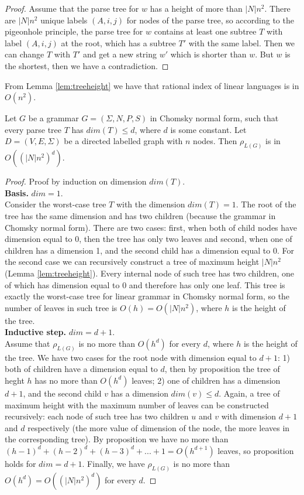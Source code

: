 \begin{proof}
 Assume that the parse tree for $w$ has a height of more than $|N|n^2$. There are $|N|n^2$ unique labels $(A, i, j)$ for nodes of the parse tree, so according to the pigeonhole principle, the parse tree for $w$ contains at least one subtree $T$ with label $(A, i, j)$ at the root, which has a subtree $T'$ with the same label. Then we can change $T$ with $T'$ and get a new string $w'$ which is shorter than $w$. But $w$ is the shortest, then we have a contradiction.

\end{proof}
From Lemma \ref{lem:treeheight} we have that rational index of linear languages is in $O(n^2)$. 
\begin{lemma}
\label{oscbnddim}
Let $G$ be a grammar $G = (\Sigma, N, P, S)$ in Chomsky normal form, such that every parse tree $T$ has $dim(T) \le d$, where $d$ is some constant. Let $D=(V, E, \Sigma)$ be a directed labelled graph with $n$ nodes. Then $\rho_{L(G)}$ is in $O({(|N|n^2)}^d)$.
\end{lemma}
\begin{proof}
Proof by induction on dimension $dim(T)$.
\\
\textbf{Basis.} $dim = 1$.
\\
Consider the worst-case tree $T$ with the dimension $dim(T) = 1$. The root of the tree has the same dimension and has two children (because the grammar in Chomsky normal form). There are two cases:  first, when both of child nodes have dimension equal to 0, then the tree has only two leaves and second, when one of children has a dimension 1, and the second child has a dimension equal to 0. For the second case we can recursively construct a tree of maximum height $|N|n^2$ (Lemma \ref{lem:treeheight}). Every internal node of such tree has two children, one of which has dimension equal to 0 and therefore has only one leaf. This tree is exactly the worst-case tree for linear grammar in Chomsky normal form, so the number of leaves in such tree is $O(h) = O(|N|n^2)$, where $h$ is the height of the tree. 
\\
\textbf{Inductive step.} $dim = d + 1$.
\\
Assume that $\rho_{L(G)}$ is no more than $O(h^{d})$ for every $d$, where $h$ is the height of the tree. We have two cases for the root node with dimension equal to $d+1$: 1) both of children have a dimension equal to $d$, then by proposition the tree of heght $h$ has no more than $O(h^{d})$ leaves; 2) one of children has a dimension $d + 1$, and the second child $v$ has a dimension $dim(v) \le d$. Again, a tree of maximum height with the maximum number of leaves can be constructed recursively:  each node of such tree has two children $u$ and $v$ with dimension $d+1$ and $d$ respectively (the more value of dimension of the node, the more leaves in the corresponding tree). By proposition we have no more than $(h-1)^d + (h-2)^d + (h-3)^d + ... + 1 = O(h^{d+1})$ leaves, so proposition holds for $dim = d+1$. Finally, we have $\rho_{L(G)}$ is no more than $O(h^{d}) = O({(|N|n^2)}^d)$ for every $d$.
\end{proof}
